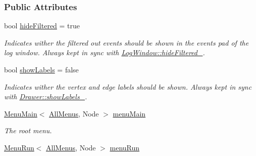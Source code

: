 \subsubsection*{Public Attributes}
\begin{DoxyCompactItemize}
\item 
bool \hyperlink{structslb_1_1core_1_1ui_1_1AllMenus_a7a65a1525bf95af856e2ebcaf238e09d}{hide\+Filtered} = true\hypertarget{structslb_1_1core_1_1ui_1_1AllMenus_a7a65a1525bf95af856e2ebcaf238e09d}{}\label{structslb_1_1core_1_1ui_1_1AllMenus_a7a65a1525bf95af856e2ebcaf238e09d}

\begin{DoxyCompactList}\small\item\em Indicates wither the filtered out events should be shown in the events pad of the log window. Always kept in sync with \hyperlink{structslb_1_1core_1_1ui_1_1LogWindow_a538ca4478f0ea842362b6754f8c80e22}{Log\+Window\+::hide\+Filtered\+\_\+}. \end{DoxyCompactList}\item 
bool \hyperlink{structslb_1_1core_1_1ui_1_1AllMenus_adbf624a1eba3c59852b5ed96cdfe80d3}{show\+Labels} = false\hypertarget{structslb_1_1core_1_1ui_1_1AllMenus_adbf624a1eba3c59852b5ed96cdfe80d3}{}\label{structslb_1_1core_1_1ui_1_1AllMenus_adbf624a1eba3c59852b5ed96cdfe80d3}

\begin{DoxyCompactList}\small\item\em Indicates wither the vertex and edge labels should be shown. Always kept in sync with \hyperlink{structslb_1_1core_1_1ui_1_1Drawer_a580db97e1c2261304eaa4dc63fb22c60}{Drawer\+::show\+Labels\+\_\+}. \end{DoxyCompactList}\item 
\hyperlink{structslb_1_1core_1_1ui_1_1MenuMain}{Menu\+Main}$<$ \hyperlink{structslb_1_1core_1_1ui_1_1AllMenus}{All\+Menus}, Node $>$ \hyperlink{structslb_1_1core_1_1ui_1_1AllMenus_ab7a574cb033c290bae6f39f43f6e08cd}{menu\+Main}\hypertarget{structslb_1_1core_1_1ui_1_1AllMenus_ab7a574cb033c290bae6f39f43f6e08cd}{}\label{structslb_1_1core_1_1ui_1_1AllMenus_ab7a574cb033c290bae6f39f43f6e08cd}

\begin{DoxyCompactList}\small\item\em The root menu. \end{DoxyCompactList}\item 
\hyperlink{structslb_1_1core_1_1ui_1_1MenuRun}{Menu\+Run}$<$ \hyperlink{structslb_1_1core_1_1ui_1_1AllMenus}{All\+Menus}, Node $>$ \hyperlink{structslb_1_1core_1_1ui_1_1AllMenus_af69fe9e838fdacf7a7f01c52f387d4a6}{menu\+Run}\hypertarget{structslb_1_1core_1_1ui_1_1AllMenus_af69fe9e838fdacf7a7f01c52f387d4a6}{}\label{structslb_1_1core_1_1ui_1_1AllMenus_af69fe9e838fdacf7a7f01c52f387d4a6}


\end{DoxyCompactItemize}
